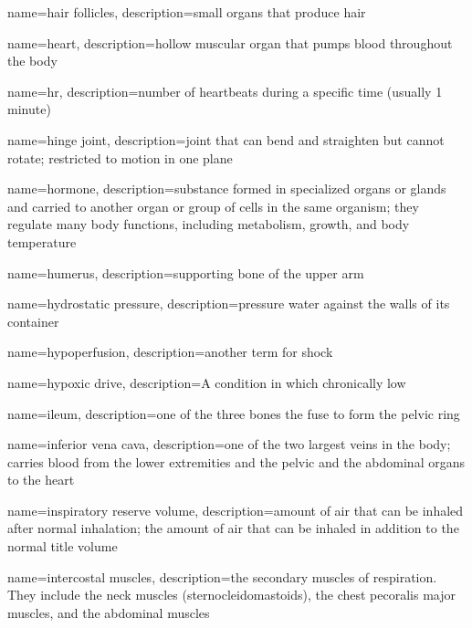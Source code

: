 \documentclass[../../EMT-169.tex]{subfiles}
\begin{document}
	{
		name=hair follicles,
		description={small organs that produce hair}
	}

	{
		name=heart,
		description={hollow muscular organ that pumps blood throughout the body}
	}

	{
		name=\acrlong{hr},
		description={number of heartbeats during a specific time (usually 1 minute)}
	}

	{
		name=hinge joint,
		description={joint that can bend and straighten but cannot rotate; restricted to motion in one plane}
	}
	
	{
		name=hormone,
		description={substance formed in specialized organs or glands and carried to another organ or group of cells in the same organism; they regulate many body functions, including metabolism, growth, and body temperature}
	}
	
	{
		name=humerus,
		description={supporting bone of the upper arm}
	}
	
	{
		name=hydrostatic pressure,
		description={pressure water against the walls of its container}
	}
	
	{
		name=hypoperfusion,
		description={another term for shock}
	}

	{
		name=hypoxic drive,
		description={A condition in which chronically low }
	}

	{
		name=ileum,
		description={one of the three bones the fuse to form the pelvic ring}
	}
	
	{
		name=inferior vena cava,
		description={one of the two largest veins in the body; carries blood from the lower extremities and the pelvic and the abdominal organs to the heart}
	}
	
	{
		name=inspiratory reserve volume,
		description={amount of air that can be inhaled after normal inhalation; the amount of air that can be inhaled in addition to the normal title volume}
	}

	{
		name=intercostal muscles,
		description={the secondary muscles of respiration.  They include the neck muscles (sternocleidomastoids), the chest pecoralis major muscles, and the abdominal muscles}
	}
		
\end{document}
